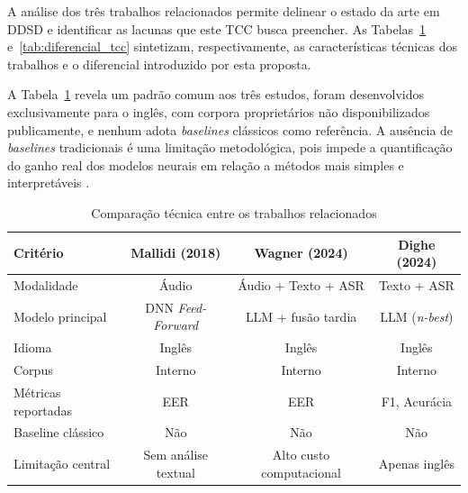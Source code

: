 \documentclass[
    12pt,                %
    openright,           %
    oneside,             %
    a4paper,             %
    english,             %
    brazil               %
]{abntex2}
\begin{document}
A análise dos três trabalhos relacionados permite delinear o estado da arte em DDSD e identificar as lacunas que este TCC busca preencher. As Tabelas~\ref{tab:comparacao_trabalhos} e~\ref{tab:diferencial_tcc} sintetizam, respectivamente, as características técnicas dos trabalhos e o diferencial introduzido por esta proposta.

A Tabela~\ref{tab:comparacao_trabalhos} revela um padrão comum aos três estudos, foram desenvolvidos exclusivamente para o inglês, com corpora proprietários não disponibilizados publicamente, e nenhum adota \textit{baselines} clássicos como referência. A ausência de \textit{baselines} tradicionais é uma limitação metodológica, pois impede a quantificação do ganho real dos modelos neurais em relação a métodos mais simples e interpretáveis \cite{Manning2008, Weld2022}.

\begin{table}[htb]
    \centering
    \caption{Comparação técnica entre os trabalhos relacionados}
    \label{tab:comparacao_trabalhos}
    \begin{tabular}{l|c|c|c}
        \toprule
        \textbf{Critério}
            & \textbf{Mallidi (2018)}
            & \textbf{Wagner (2024)}
            & \textbf{Dighe (2024)} \\
        \midrule
        Modalidade
            & Áudio
            & Áudio + Texto + ASR
            & Texto + ASR \\
        \midrule
        Modelo principal
            & DNN \textit{Feed-Forward}
            & LLM + fusão tardia
            & LLM (\textit{n-best}) \\
        \midrule
        Idioma
            & Inglês
            & Inglês
            & Inglês \\
        \midrule
        Corpus
            & Interno
            & Interno
            & Interno \\
        \midrule
        Métricas reportadas
            & EER
            & EER
            & F1, Acurácia \\
        \midrule
        Baseline clássico
            & Não
            & Não
            & Não \\
        \midrule
        Limitação central
            & Sem análise textual
            & Alto custo computacional
            & Apenas inglês \\
        \bottomrule
    \end{tabular}
\end{table}
\end{document}
